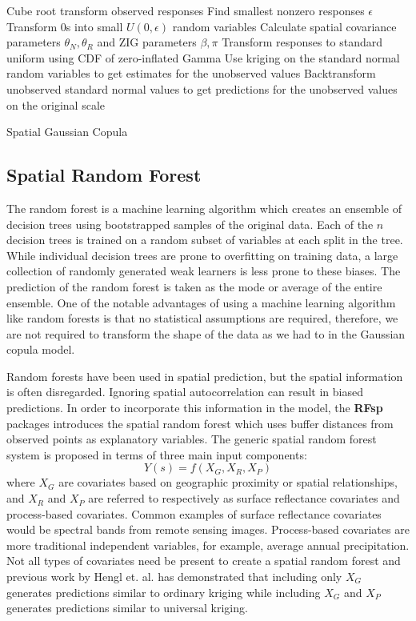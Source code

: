 \documentclass{article}
\begin{document}
\begin{singlespace}
\begin{algorithm}[H]
\SetAlgoLined
{}
 {
	Cube root transform observed responses\; 
	Find smallest nonzero responses $\epsilon$ \;
	Transform 0s into small $U(0, \epsilon)$ random variables\;
	Calculate spatial covariance parameters $\theta_N, \theta_R$ and ZIG parameters $\beta, \pi$\;
	Transform responses to standard uniform using CDF of zero-inflated Gamma\; 
	Use kriging on the standard normal random variables to get estimates for the unobserved values \;
	Backtransform unobserved standard normal values to get predictions for the unobserved values on the original scale\; 
}
	\caption{Spatial Gaussian Copula}
\end{algorithm}
\end{singlespace}

\subsection{Spatial Random Forest}
The random forest is a machine learning algorithm which creates an ensemble of decision trees using bootstrapped samples of the original data\cite{breiman01}.
Each of the $n$ decision trees is trained on a random subset of variables at each split in the tree.
While individual decision trees are prone to overfitting on training data, a large collection of randomly generated weak learners is less prone to these biases.
The prediction of the random forest is taken as the mode or average of the entire ensemble.
One of the notable advantages of using a machine learning algorithm like random forests is that no statistical assumptions are required, therefore, we are not required to transform the shape of the data as we had to in the Gaussian copula model.

Random forests have been used in spatial prediction, but the spatial information is often disregarded\cite{hengl18}.
Ignoring spatial autocorrelation can result in biased predictions.
In order to incorporate this information in the model, the \textbf{RFsp} packages introduces the spatial random forest which uses buffer distances from observed points as explanatory variables.
The generic spatial random forest system is proposed in terms of three main input components:
$$
Y(s) = f(X_G, X_R, X_P)
$$
where $X_G$ are covariates based on geographic proximity or spatial relationships, and $X_R$ and $X_P$ are referred to respectively as surface reflectance covariates and process-based covariates.
Common examples of surface reflectance covariates would be spectral bands from remote sensing images.
Process-based covariates are more traditional independent variables, for example, average annual precipitation.
Not all types of covariates need be present to create a spatial random forest and previous work by Hengl et. al. has demonstrated that including only $X_G$ generates predictions similar to ordinary kriging while including $X_G$ and $X_P$ generates predictions similar to universal kriging\cite{hengl18}.
\end{document}
